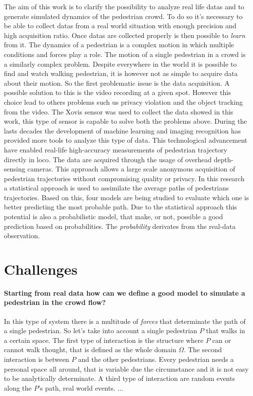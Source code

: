 \documentclass[class=article, crop=false]{standalone}
\begin{document}
The aim of this work is to clarify the possibility to analyze real life datas and to generate simulated dynamics of the pedestrian crowd.
To do so it's necessary to be able to collect datas from a real world situation with enough precision and high acquisition ratio.
Once datas are collected properly is then possible to \emph{learn} from it.
The dynamics of a pedestrian is a complex motion in which multiple conditions and forces play a role.
The motion of a single pedestrian in a crowd is a similarly complex problem.
Despite everywhere in the world it is possible to find and watch walking pedestrian, it is however not as simple to acquire data about their motion.
So the first problematic issue is the data acquisition.
A possible solution to this is the video recording at a given spot.
However this choice lead to others problems such us privacy violation and the object tracking from the video.
The Xovis sensor was used to collect the data showed in this work, this type of sensor is capable to solve both the problems above.
During the lasts decades the development of machine learning and imaging recognition has provided more tools to analyze this type of data.
This technological advancement have enabled real-life high-accuracy measurements of pedestrian trajectory directly in loco.
The data are acquired through the usage of overhead depth-sensing cameras.
This approach allows a large scale anonymous acquisition of pedestrian trajectories without compromising quality or privacy.
In this research a statistical approach is used to assimilate the average paths of pedestrians trajectories.
Based on this, four models are being studied to evaluate which one is better predicting the most probable path.
Due to the statistical approach this potential is also a probabilistic model, that make, or not, possible a good prediction based on probabilities.
The \emph{probability} derivates from the real-data observation.




\section{Challenges}

\paragraph{Starting from real data how can we define a good model to simulate a pedestrian in the crowd flow?}
In this type of system there is a multitude of \emph{forces} that determinate the path of a single pedestrian.
So let's take into account a single pedestrian $P$ that walks in a certain space.
The first type of interaction is the structure where $P$ can or cannot walk thought, that is defined as the whole domain $\Omega$.
The second interaction is between $P$ and the other pedestrians.
Every pedestrian needs a personal space all around, that is variable due the circumstance and it is not easy to be analytically determinate.
A third type of interaction are random events along the $P$'s path, real world events.
...
\end{document}
